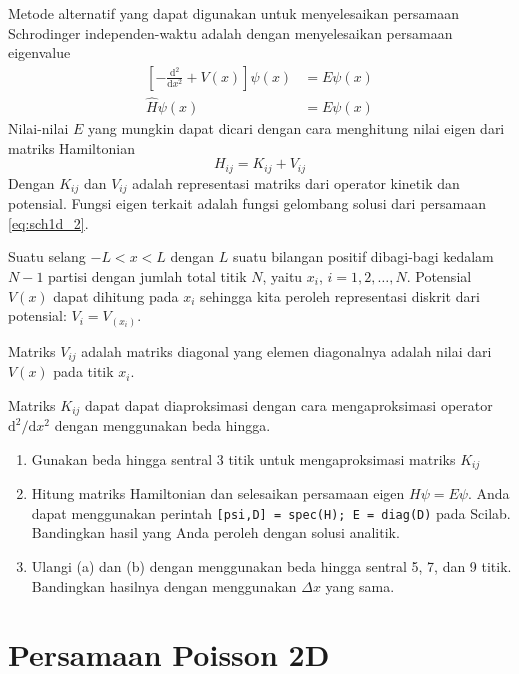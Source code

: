 \documentclass[10pt,bahasa]{article}
\begin{document}
Metode alternatif
yang dapat digunakan untuk menyelesaikan persamaan
Schrodinger independen-waktu adalah dengan menyelesaikan
persamaan eigenvalue
\begin{align}
\left[-\frac{\mathrm{d}^2}{\mathrm{d}x^2} + V(x)\right]\psi(x) & = E\psi(x) \\
\hat{H}\psi(x) & = E \psi(x)
\end{align}
Nilai-nilai $E$ yang mungkin dapat dicari dengan cara menghitung
nilai eigen dari matriks Hamiltonian 
\begin{equation}
H_{ij} = K_{ij} + V_{ij}
\end{equation}
Dengan $K_{ij}$ dan $V_{ij}$ adalah representasi matriks dari operator
kinetik dan potensial.
Fungsi eigen terkait adalah fungsi gelombang solusi dari
persamaan \eqref{eq:sch1d_2}.

Suatu selang $-L < x < L$ dengan $L$ suatu bilangan positif
dibagi-bagi kedalam $N-1$ partisi dengan jumlah total titik $N$,
yaitu $x_{i}$, $i = 1, 2, \ldots, N$.
Potensial $V(x)$ dapat dihitung pada $x_{i}$ sehingga
kita peroleh representasi diskrit dari potensial:
$V_{i} = V_(x_{i})$.

Matriks $V_{ij}$ adalah matriks diagonal yang elemen diagonalnya adalah
nilai dari $V(x)$ pada titik $x_{i}$.

Matriks $K_{ij}$ dapat
dapat diaproksimasi dengan cara mengaproksimasi operator $\mathrm{d}^2/\mathrm{d}x^2$
dengan menggunakan beda hingga.

\begin{enumerate}[label=(\alph*)]
\item Gunakan beda hingga sentral 3 titik untuk mengaproksimasi matriks $K_{ij}$
\item Hitung matriks Hamiltonian dan selesaikan persamaan eigen $H\psi = E\psi$. Anda dapat
menggunakan perintah \texttt{[psi,D] = spec(H); E = diag(D)} pada Scilab.
Bandingkan hasil yang Anda peroleh dengan solusi analitik.
\item Ulangi (a) dan (b) dengan menggunakan beda hingga sentral 5, 7, dan 9 titik.
Bandingkan hasilnya dengan menggunakan $\Delta x$ yang sama.
\end{enumerate}


\section{Persamaan Poisson 2D}
\end{document}
